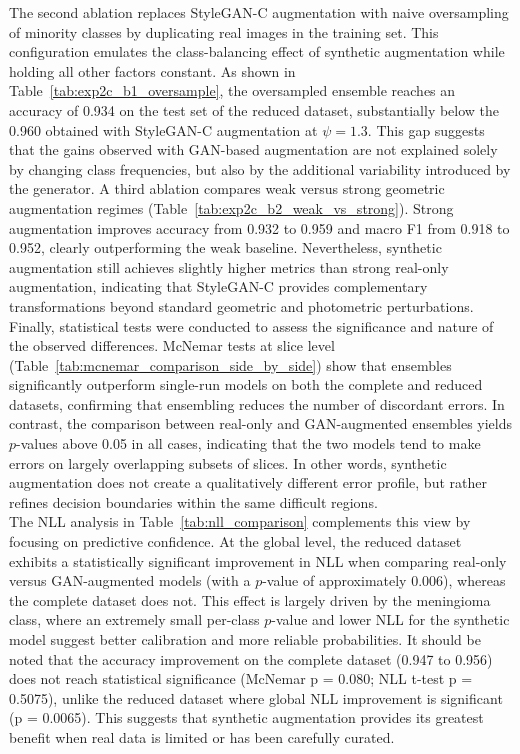 The second ablation replaces StyleGAN-C augmentation with naive oversampling of minority classes by duplicating real images in the training set. This configuration emulates the class-balancing effect of synthetic augmentation while holding all other factors constant. As shown in Table~\ref{tab:exp2c_b1_oversample}, the oversampled ensemble reaches an accuracy of 0.934 on the test set of the reduced dataset, substantially below the 0.960 obtained with StyleGAN-C augmentation at $\psi = 1.3$. This gap suggests that the gains observed with GAN-based augmentation are not explained solely by changing class frequencies, but also by the additional variability introduced by the generator. A third ablation compares weak versus strong geometric augmentation regimes (Table~\ref{tab:exp2c_b2_weak_vs_strong}). Strong augmentation improves accuracy from 0.932 to 0.959 and macro F1 from 0.918 to 0.952, clearly outperforming the weak baseline. Nevertheless, synthetic augmentation still achieves slightly higher metrics than strong real-only augmentation, indicating that StyleGAN-C provides complementary transformations beyond standard geometric and photometric perturbations.\\

Finally, statistical tests were conducted to assess the significance and nature of the observed differences. McNemar tests at slice level (Table~\ref{tab:mcnemar_comparison_side_by_side}) show that ensembles significantly outperform single-run models on both the complete and reduced datasets, confirming that ensembling reduces the number of discordant errors. In contrast, the comparison between real-only and GAN-augmented ensembles yields $p$-values above 0.05 in all cases, indicating that the two models tend to make errors on largely overlapping subsets of slices. In other words, synthetic augmentation does not create a qualitatively different error profile, but rather refines decision boundaries within the same difficult regions. \\

The NLL analysis in Table~\ref{tab:nll_comparison} complements this view by focusing on predictive confidence. At the global level, the reduced dataset exhibits a statistically significant improvement in NLL when comparing real-only versus GAN-augmented models (with a $p$-value of approximately $0.006$), whereas the complete dataset does not. This effect is largely driven by the meningioma class, where an extremely small per-class $p$-value and lower NLL for the synthetic model suggest better calibration and more reliable probabilities. It should be noted that the accuracy improvement on the complete dataset (0.947 to 0.956) does not reach statistical significance (McNemar p = 0.080; NLL t-test p = 0.5075), unlike the reduced dataset where global NLL improvement is significant (p = 0.0065). This suggests that synthetic augmentation provides its greatest benefit when real data is limited or has been carefully curated.

